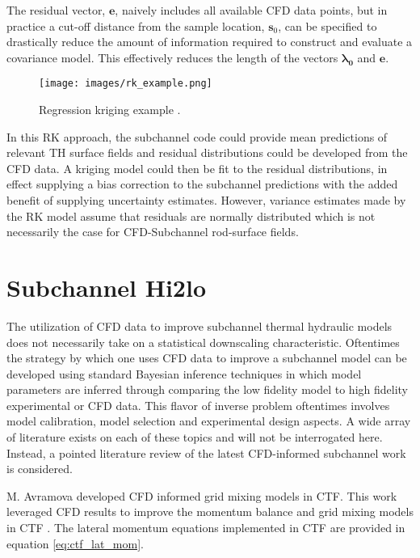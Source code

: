 The residual vector, $\mathbf e$, naively includes all available CFD data points, but in practice a cut-off distance from the sample location, $\mathbf s_0$, can be specified to drastically reduce the amount of information required to construct and evaluate a covariance model.  This effectively reduces the length of the vectors $\mathbf{\lambda_0}$ and $\mathbf e$.

\begin{figure}[hbtp]
\centering
\texttt{[image: images/rk\_example.png]}
\caption[Regression kriging example.]{Regression kriging example \cite{Hengl07}.}
\label{fit:rk}
\end{figure}

In this RK approach, the subchannel code could provide mean predictions of relevant TH surface fields and residual distributions could be developed from the CFD data.  A kriging model could then be fit to the residual distributions, in effect supplying a bias correction to the subchannel predictions with the added benefit of supplying uncertainty estimates.  However, variance estimates made by the RK model assume that residuals are normally distributed which is not necessarily the case for CFD-Subchannel rod-surface fields.


\section{Subchannel Hi2lo}

The utilization of CFD data to improve subchannel thermal hydraulic models does not necessarily take on a statistical downscaling characteristic.  Oftentimes the strategy by which one uses CFD data to improve a subchannel model can be developed using standard Bayesian inference techniques in which model parameters are inferred through comparing the low fidelity model to high fidelity experimental or CFD data.  This flavor of inverse problem oftentimes involves  model calibration, model selection and experimental design aspects.  A wide array of literature exists on each of these topics and will not be interrogated here.  Instead, a pointed literature review of the latest CFD-informed subchannel work is considered.

 M. Avramova developed CFD informed grid mixing models in CTF.  This work leveraged CFD results to improve the momentum balance and grid mixing models in CTF \cite{avramova2007}.  The lateral momentum equations implemented in CTF are provided in equation \ref{eq:ctf_lat_mom}.

